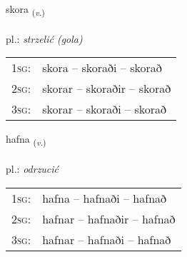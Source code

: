 \documentclass[frontgrid, backgrid]{flacards}\usepackage[]{graphicx}\usepackage[]{xcolor}
\begin{document}
\renewcommand{\flhead}{\vskip5pt \fboxsep=0pt {\small\bfseries\footnotesize Sagnorð | czasownik}}
\renewcommand{\fcfoot}{\vskip5pt \fboxsep=0pt \hspace{2pt}{\small\bfseries\footnotesize 1K}}

\renewcommand{\blhead}{\vskip5pt {\small\bfseries\footnotesize Sagnorð | czasownik }}
\renewcommand{\bcfoot}{\vskip5pt \hspace{2pt}{\small\bfseries\footnotesize 1K}}


{skora \small{\textsubscript{(\textit{v.})}} \\[1ex] %
\textphonetic{[skɔːra]} \\
pl.: \emph{strzelić (gola)} \\  [2ex]
\renewcommand*{\arraystretch}{0.8}
\begin{tabular}{p{1cm}l}
\textsc{1sg}: & skora -- skoraði -- skorað \\ 
\textsc{2sg}: & skorar -- skoraðir -- skorað \\ 
\textsc{3sg}: & skorar -- skoraði -- skorað \\ 
\end{tabular}
}

\renewcommand{\flhead}{\vskip5pt \fboxsep=0pt {\small\bfseries\footnotesize Sagnorð | czasownik}}
\renewcommand{\fcfoot}{\vskip5pt \fboxsep=0pt \hspace{2pt}{\small\bfseries\footnotesize 1K}}

\renewcommand{\blhead}{\vskip5pt {\small\bfseries\footnotesize Sagnorð | czasownik }}
\renewcommand{\bcfoot}{\vskip5pt \hspace{2pt}{\small\bfseries\footnotesize 1K}}


{hafna \small{\textsubscript{(\textit{v.})}} \\[1ex] %
\textphonetic{[hapna]} \\
pl.: \emph{odrzucić} \\  [2ex]
\renewcommand*{\arraystretch}{0.8}
\begin{tabular}{p{1cm}l}
\textsc{1sg}: & hafna -- hafnaði -- hafnað \\ 
\textsc{2sg}: & hafnar -- hafnaðir -- hafnað \\ 
\textsc{3sg}: & hafnar -- hafnaði -- hafnað \\ 
\end{tabular}
}
\end{document}
